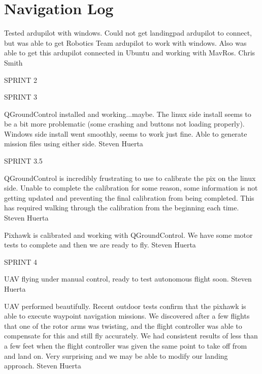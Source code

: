 \section{Navigation Log}

\begin{description}
\item [10/03/15]  Tested ardupilot with windows. Could not get landingpad ardupilot to connect, but was able to get Robotics Team ardupilot to work with windows. Also was able to get this ardupilot connected in Ubuntu and working with MavRos. \hfill{Chris Smith}


\item SPRINT 2

\item SPRINT 3

\item [11/16/15]  QGroundControl installed and working...maybe. The linux side install seems to be a bit more problematic (some crashing and buttons not loading properly). Windows side install went smoothly, seems to work just fine. Able to generate mission files using either side.  \hfill{Steven Huerta}

\item SPRINT 3.5

\item [12/21/15]  QGroundControl is incredibly frustrating to use to calibrate the pix on the linux side. Unable to complete the calibration for some reason, some information is not getting updated and preventing the final calibration from being completed. This has required walking through the calibration from the beginning each time.  \hfill{Steven Huerta}

\item [1/4/16]  Pixhawk is calibrated and working with QGroundControl. We have some motor tests to complete and then we are ready to fly. \hfill{Steven Huerta}

\item SPRINT 4

\item [1/18/16]  UAV flying under manual control, ready to test autonomous flight soon. \hfill{Steven Huerta}

\item [1/25/16]  UAV performed beautifully. Recent outdoor tests confirm that the pixhawk is able to execute waypoint navigation missions. We discovered after a few flights that one of the rotor arms was twisting, and the flight controller was able to compensate for this and still fly accurately. We had consistent results of less than a few feet when the flight controller was given the same point to take off from and land on. Very surprising and we may be able to modify our landing approach.  \hfill{Steven Huerta}


\end{description}
